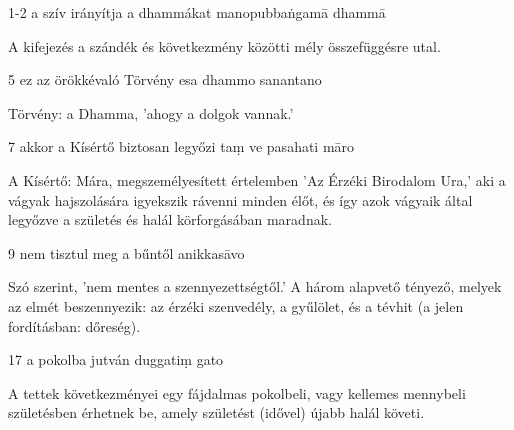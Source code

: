 
\begin{notesdescription}

\item[{1-2}
{a szív irányítja a dhammákat}
{manopubbaṅgamā dhammā}] \hfill\par

A kifejezés a szándék és következmény közötti mély összefüggésre utal.

\item[{5}
{ez az örökkévaló Törvény}
{esa dhammo sanantano}] \hfill\par

Törvény: a Dhamma, 'ahogy a dolgok vannak.'

\item[{7}
{akkor a Kísértő biztosan legyőzi}
{taṃ ve pasahati māro}] \hfill\par

A Kísértő: Mára, megszemélyesített értelemben 'Az Érzéki Birodalom Ura,' aki a vágyak hajszolására igyekszik rávenni minden élőt, és így azok vágyaik által legyőzve a születés és halál körforgásában maradnak.

\item[{9}
{nem tisztul meg a bűntől}
{anikkasāvo}] \hfill\par

Szó szerint, 'nem mentes a szennyezettségtől.' A három alapvető tényező, melyek az elmét beszennyezik: az érzéki szenvedély, a gyűlölet, és a tévhit (a jelen fordításban: dőreség).

\item[{17}
{a pokolba jutván}
{duggatiṃ gato}] \hfill\par

A tettek következményei egy fájdalmas pokolbeli, vagy kellemes mennybeli születésben érhetnek be, amely születést (idővel) újabb halál követi.

\end{notesdescription}
